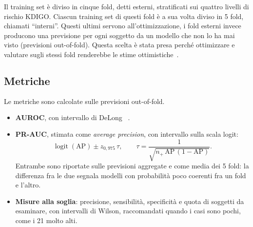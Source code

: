 \documentclass[a4paper, 12pt, oneside]{book}
\begin{document}
Il training set è diviso in cinque fold, detti esterni, stratificati sui quattro livelli di rischio KDIGO. Ciascun training set di questi fold è a sua volta diviso in 5 fold, chiamati \enquote{interni}. Questi ultimi servono all'ottimizzazione, i fold esterni invece producono una previsione per ogni soggetto da un modello che non lo ha mai visto (previsioni out-of-fold). Questa scelta è stata presa perché ottimizzare e valutare sugli stessi fold renderebbe le stime ottimistiche~\cite{varma_bias_2006,cawley_over-fitting_2010}.

\subsection{Metriche}

Le metriche sono calcolate sulle previsioni out-of-fold.
\begin{itemize}
	\item \textbf{AUROC}, con intervallo di DeLong ~\cite{delong_comparing_1988}.
	\item \textbf{PR-AUC}, stimata come \textit{average precision}, con intervallo sulla scala logit:
	\begin{equation}
		\operatorname{logit}(\mathrm{AP}) \pm z_{0{,}975}\,\tau, \qquad \tau = \frac{1}{\sqrt{n_{+}\,\mathrm{AP}\,(1-\mathrm{AP})}} .
	\end{equation}
	Entrambe sono riportate sulle previsioni aggregate e come media dei 5 fold: la differenza fra le due segnala modelli con probabilità poco coerenti fra un fold e l'altro.
	\item \textbf{Misure alla soglia}: precisione, sensibilità, specificità e quota di soggetti da esaminare, con intervalli di Wilson, raccomandati quando i casi sono pochi, come i 21 molto alti.
\end{itemize}
\end{document}

